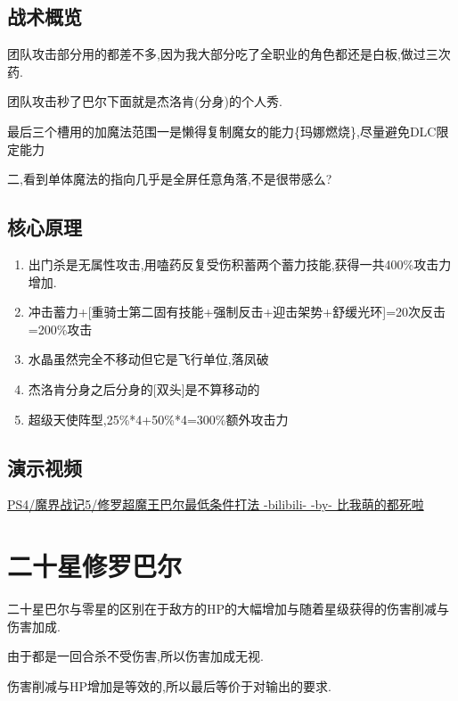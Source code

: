 	\subsection{战术概览}

	团队攻击部分用{\color{red}{大魔拳超魔流刷过全职业}}的都差不多,因为我大部分吃了全职业的角色都还是白板,做过三次药.

	团队攻击秒了巴尔下面就是杰洛肯(分身)的个人秀.

	最后三个槽用的加魔法范围一是懒得复制魔女的能力\{玛娜燃烧\},尽量避免DLC限定能力
	
	二,看到单体魔法的指向几乎是全屏任意角落,不是很带感么?

	\subsection{核心原理}

	\begin{enumerate}
		\item 出门杀是无属性攻击,用嗑药反复受伤积蓄两个蓄力技能,获得一共400\%攻击力增加.

		\item 冲击蓄力+[重骑士第二固有技能+强制反击+迎击架势+舒缓光环]=20次反击=200\%攻击

		\item 水晶虽然完全不移动但它是飞行单位,落凤破

		\item 杰洛肯分身之后分身的[双头]是不算移动的
		
		\item 超级天使阵型,25\%*4+50\%*4=300\%额外攻击力
	\end{enumerate}

	\subsection{演示视频}
	\href{http://www.bilibili.com/video/av2976870/}{PS4/魔界战记5/修罗超魔王巴尔最低条件打法 -bilibili- -by- 比我萌的都死啦}


	\newpage

	\section{二十星修罗巴尔}

	二十星巴尔与零星的区别在于敌方的HP的大幅增加与随着星级获得的伤害削减与伤害加成.

	由于都是一回合杀不受伤害,所以伤害加成无视.

	伤害削减与HP增加是等效的,所以最后等价于对输出的要求.

